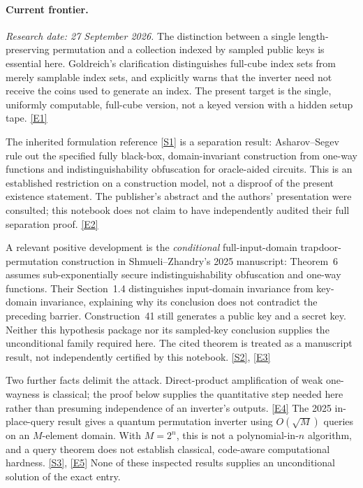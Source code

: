 \documentclass[11pt,a4paper]{article}
\newcommand{\sref}[2]{\hyperlink{source:#1:#2}{[S#2]}}
\newcommand{\eref}[2]{\hyperlink{extra:#1:#2}{[E#2]}}
\numberwithin{equation}{section}
\begin{document}
\paragraph{Current frontier.}
\textit{Research date: 27 September 2026.}
The distinction between a single length-preserving permutation and a
collection indexed by sampled public keys is essential here. Goldreich's
clarification distinguishes full-cube index sets from merely samplable
index sets, and explicitly warns that the inverter need not receive the
coins used to generate an index. The present target is the single,
uniformly computable, full-cube version, not a keyed version with a hidden
setup tape. \eref{30006696}{1}

The inherited formulation reference \sref{30006696}{1} is a separation result:
Asharov--Segev rule out the specified fully black-box, domain-invariant
construction from one-way functions and indistinguishability obfuscation
for oracle-aided circuits. This is an established restriction on a
construction model, not a disproof of the present existence statement.
The publisher's abstract and the authors' presentation were consulted;
this notebook does not claim to have independently audited their full
separation proof. \eref{30006696}{2}

A relevant positive development is the \emph{conditional} full-input-domain
trapdoor-permutation construction in Shmueli--Zhandry's 2025 manuscript:
Theorem~6 assumes sub-exponentially secure indistinguishability obfuscation
and one-way functions. Their Section~1.4 distinguishes input-domain
invariance from key-domain invariance, explaining why its conclusion does
not contradict the preceding barrier. Construction~41 still generates a
public key and a secret key. Neither this hypothesis package nor its
sampled-key conclusion supplies the unconditional family required here.
The cited theorem is treated as a manuscript result, not independently
certified by this notebook. \sref{30006696}{2}, \eref{30006696}{3}

Two further facts delimit the attack. Direct-product amplification of weak
one-wayness is classical; the proof below supplies the quantitative step
needed here rather than presuming independence of an inverter's outputs.
\eref{30006696}{4} The 2025 in-place-query result gives a quantum permutation
inverter using $O(\sqrt{M})$ queries on an $M$-element domain. With
$M=2^n$, this is not a polynomial-in-$n$ algorithm, and a query theorem does
not establish classical, code-aware computational hardness.
\sref{30006696}{3}, \eref{30006696}{5} None of these inspected results supplies an
unconditional solution of the exact entry.
\end{document}
